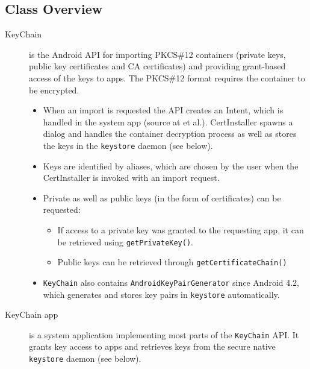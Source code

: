 \documentclass[a4paper,draft]{scrartcl}
\begin{document}
	\subsection{Class Overview}
		\begin{description}
			\item[KeyChain] is the Android API for importing PKCS\#12 containers (private keys, public key certificates and CA certificates) and providing grant-based access of the keys to apps. The PKCS\#12 format requires the container to be encrypted. %
				\begin{itemize}
					\item When an import is requested the API creates an Intent, which is handled in the system app  (source at  et al.). CertInstaller spawns a dialog and handles the container decryption process as well as stores the keys in the \texttt{keystore} daemon (see below).
					\item Keys are identified by aliases, which are chosen by the user when the CertInstaller is invoked with an import request.
					\item Private as well as public keys (in the form of certificates) can be requested:
					\begin{itemize}
						\item If access to a private key was granted to the requesting app, it can be retrieved using \texttt{getPrivateKey()}.
						\item Public keys can be retrieved through \texttt{getCertificateChain()}
					\end{itemize}
				\item \texttt{KeyChain} also contains \texttt{AndroidKeyPairGenerator} since Android 4.2, which generates and stores key pairs in \texttt{key\-store} automatically.
				\end{itemize}

			\item[KeyChain app] is a system application implementing most parts of the \texttt{KeyChain} API. It grants key access to apps and retrieves keys from the secure native \texttt{keystore} daemon (see below).


\end{description}
\end{document}

